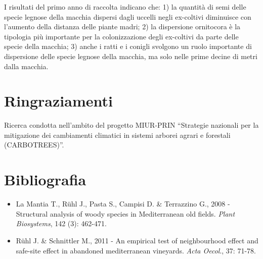 I risultati del primo anno di raccolta indicano che: 1) la quantit\`a di
semi delle specie legnose della macchia dispersi dagli uccelli negli
ex-coltivi diminuisce con l{\textquoteright}aumento della distanza
delle piante madri; 2) la dispersione ornitocora \`e la tipologia pi\`u
importante per la colonizzazione degli ex-coltivi da parte delle specie
della macchia; 3) anche i ratti e i conigli svolgono un ruolo
importante di dispersione delle specie legnose della macchia, ma solo
nelle prime decine di metri dalla macchia.

\section*{Ringraziamenti}

Ricerca condotta nell{\textquoteright}ambito del progetto MIUR-PRIN
{\textquotedblleft}Strategie nazionali per la mitigazione dei
cambiamenti climatici in sistemi arborei agrari e forestali
(CARBOTREES){\textquotedblright}.

\section*{Bibliografia}
\begin{itemize}\itemsep0pt
	\item La Mantia T., R\"uhl J., Pasta S., Campisi D. \& Terrazzino G., 2008 -
Structural analysis of woody species in Mediterranean old fields.
\textit{Plant Biosystems}, 142 (3): 462-471.

	\item R\"uhl J. \& Schnittler M., 2011 - An empirical test of neighbourhood
effect and safe-site effect in abandoned mediterranean vineyards.
\textit{Acta Oecol}., 37: 71-78.
\end{itemize}
